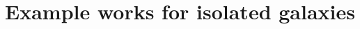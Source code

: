 \documentclass[10pt,aspectratio=169]{beamer}
\begin{document}
\section{Example works for isolated galaxies}
\end{document}
